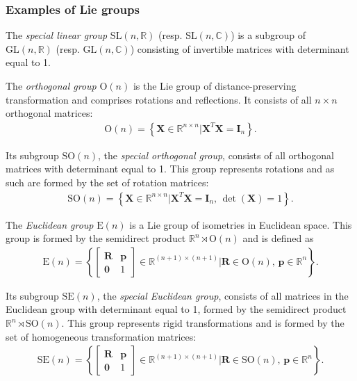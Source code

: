 \subsubsection{Examples of Lie groups}
\begin{example}\label{ex:general-linear-group-special-linear-group}
    The \emph{special linear group} $\text{SL}(n, \mathbb{R})$ (resp. $\text{SL}(n, \mathbb{C})$) is a subgroup of $\text{GL}(n, \mathbb{R})$ (resp. $\text{GL}(n, \mathbb{C})$) consisting of invertible matrices with determinant equal to 1.
\end{example}
\begin{example}\label{ex:orthogonal-group-special-orthogonal-group}
    The \emph{orthogonal group} $\text{O}(n)$ is the Lie group of distance-preserving transformation and comprises rotations and reflections. It consists of all $n\times n$ orthogonal matrices:
    \begin{align}
        \text{O}(n) = \left\{\mathbf{X}\in\mathbb{R}^{n\times n} | \mathbf{X}^T\mathbf{X} = \mathbf{I}_n\right\}.
    \end{align}

    Its subgroup $\text{SO}(n)$, the \emph{special orthogonal group}, consists of all orthogonal matrices with determinant equal to 1. This group represents rotations and as such are formed by the set of rotation matrices:
    \begin{align}
        \text{SO}(n) = \left\{\mathbf{X}\in\mathbb{R}^{n\times n} | \mathbf{X}^T\mathbf{X} = \mathbf{I}_n,\, \det(\mathbf{X}) = 1\right\}.
    \end{align}
\end{example}
\begin{example}\label{ex:euclidean-group-special-euclidean-group}
    The \emph{Euclidean group} $\text{E}(n)$ is a Lie group of isometries in Euclidean space. This group is formed by the semidirect product $\mathbb{R}^n \rtimes \text{O}(n)$ and is defined as
    \begin{align}
        \text{E}(n) = \left\{\begin{bmatrix}
            \mathbf{R} & \mathbf{p} \\ \mathbf{0} & 1
        \end{bmatrix} \in \mathbb{R}^{(n+1)\times(n+1)} | \mathbf{R}\in\text{O}(n),\, \mathbf{p}\in\mathbb{R}^n\right\}.
    \end{align}

    Its subgroup $\text{SE}(n)$, the \emph{special Euclidean group}, consists of all matrices in the Euclidean group with determinant equal to 1, formed by the semidirect product $\mathbb{R}^n\rtimes \text{SO}(n)$. This group represents rigid transformations and is formed by the set of homogeneous transformation matrices:
    \begin{align}
        \text{SE}(n) = \left\{\begin{bmatrix}
            \mathbf{R} & \mathbf{p} \\ \mathbf{0} & 1
        \end{bmatrix} \in \mathbb{R}^{(n+1)\times(n+1)} | \mathbf{R}\in\text{SO}(n),\, \mathbf{p}\in\mathbb{R}^n\right\}.
    \end{align}
\end{example}
